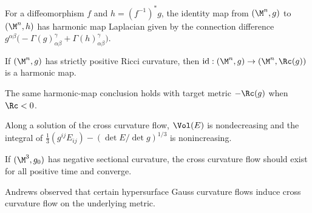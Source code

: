 \begin{corollary}
\label{ch03-cor-identity-harmonic-map}

For a diffeomorphism \(f\) and \(h=(f^{-1})^*g\), the identity map from \((\M^n,g)\) to \((\M^n,h)\) has harmonic map Laplacian given by the connection difference \(g^{\alpha\beta}\bigl(-\Gamma(g)^\gamma_{\alpha\beta}+\Gamma(h)^\gamma_{\alpha\beta}\bigr)\).
\end{corollary}

\begin{corollary}
\label{ch03-cor-positive-ricci-identity-harmonic}

If \((\M^n,g)\) has strictly positive Ricci curvature, then \(\mathrm{id}:(\M^n,g)\to(\M^n,\Rc(g))\) is a harmonic map.
\end{corollary}

\begin{remark}
\label{ch03-rem-negative-ricci-target}

The same harmonic-map conclusion holds with target metric \(-\Rc(g)\) when \(\Rc<0\).
\end{remark}

\begin{proposition}
\label{ch03-prop-cross-curvature-monotonicity}

Along a solution of the cross curvature flow, \(\Vol(E)\) is nondecreasing and the integral of \(\frac13(g^{ij}E_{ij})-(\det E/\det g)^{1/3}\) is nonincreasing.
\end{proposition}

\begin{conjecture}
\label{ch03-conj-cross-curvature-global-existence}

If \((\M^3,g_0)\) has negative sectional curvature, the cross curvature flow should exist for all positive time and converge.
\end{conjecture}

\begin{remark}
\label{ch03-rem-andrews-observation}

Andrews observed that certain hypersurface Gauss curvature flows induce cross curvature flow on the underlying metric.
\end{remark}

